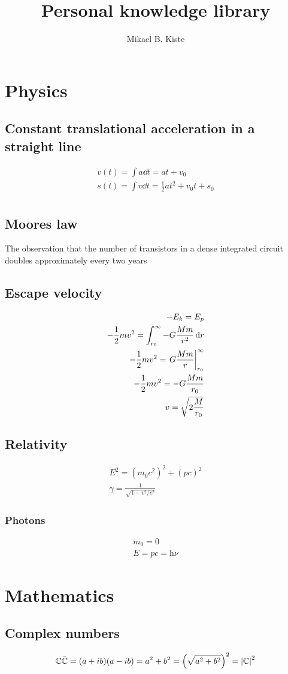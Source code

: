 \documentclass[10pt,a4paper]{article}
\author{Mikael B. Kiste}
\title{Personal knowledge library}
\newcommand{\h}{\mathrm{h}}
\begin{document}
	\maketitle
	\tableofcontents
	\newpage
	
	\section{Physics}
		\subsection{Constant translational acceleration in a straight line}
			\begin{gather}\label{}
				v(t)=\int a \dd{t}=at+v_0\\
				s(t)=\int v \dd{t}=\frac{1}{2}at^2+v_0t+s_0\\
			\end{gather}
		
		\subsection{Moores law}
		The observation that the number of transistors in a dense integrated circuit doubles approximately every two years
		
		\subsection{Escape velocity}
		\begin{align}
		-E_k = E_p\\
		-\frac{1}{2}mv^2 = \int_{r_0}^{\infty}-G\frac{Mm}{r^2}\dd{r}\\
		-\frac{1}{2}mv^2 = \eval{G\frac{Mm}{r}}_{r_0}^\infty\\
		-\frac{1}{2}mv^2 = -G\frac{Mm}{r_0}\\
		v = \sqrt{2\frac{M}{r_0}}
		\end{align}

		\subsection{Relativity}
			\begin{align}
				E^2 = (m_0c^2)^2 + (pc)^2\\
				\gamma = \frac{1}{\sqrt{1-v^2/c^2}} 
			\end{align}
			\subsubsection{Photons}
			\begin{align}
				m_0 = 0\\
				E = pc = \h\nu
			\end{align}

	\newpage
	\section{Mathematics}
		\subsection{Complex numbers}
		\begin{equation}
			\mathbb{C} \bar{\mathbb{C}} = (a+ib) (a-ib) = a^2 + b^2 = \qty(\sqrt{a^2 + b^2})^2 = \abs{\mathbb{C}}^2
		\end{equation}
\end{document}
